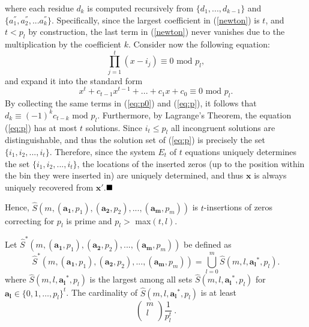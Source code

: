 \documentclass[10pt,conference]{IEEEtran}
\begin{document}
{\begin{equation}
\end{equation}
where each residue $d_k$ is computed recursively from
$\{d_1,...,d_{k-1}\}$ and $\{a_1^{''},a_2^{''},...a_k^{''}\}$.
Specifically, since the largest coefficient in (\ref{newton}) is
$t$, and $t<p_l$ by construction, the last term in (\ref{newton})
never vanishes due to the multiplication by the coefficient $k$.
Consider now the following equation:
\begin{equation}\label{eq:p0} \prod_{j=1}^t(x-i_j)\equiv 0 \text{ mod } p_l,
\end{equation}
and expand it into the standard form
\begin{equation}\label{eq:p}
x^t+c_{t-1}x^{t-1}+...+c_1x+c_0 \equiv 0 \text{ mod } p_l.
\end{equation}
By collecting the same terms in (\ref{eq:p0}) and (\ref{eq:p}), it
follows that $d_k \equiv (-1)^kc_{t-k} \text{ mod } p_l$.
Furthermore, by Lagrange's Theorem, the equation (\ref{eq:p}) has at
most $t$ solutions. Since $i_t \leq p_l$ all incongruent solutions
are distinguishable, and thus the solution set of (\ref{eq:p}) is
precisely the set $\{i_1,i_2,...,i_t\}$. Therefore, since the system
$E_t$ of $t$ equations uniquely determines the set
$\{i_1,i_2,...,i_t\}$, the locations of the inserted zeros (up to
the position within the bin they were inserted in) are uniquely
determined, and thus $\mathbf{x}$ is always uniquely recovered from
$\mathbf{x'}$.$\hfill\blacksquare$ }

Hence,
$\hat{S}\left(m,(\mathbf{a_1},p_1),(\mathbf{a_2},p_2),...,(\mathbf{a_m},p_m)\right)$
is $t$-insertions of zeros correcting for $p_l$ is prime and $p_l >$
max$(t,l)$.

 Let
$\hat{S}^*\left(m,(\mathbf{a_1},p_1),(\mathbf{a_2},p_2),...,(\mathbf{a_m},p_m)\right)$
be defined as
\begin{equation}\label{union}\hat{S}^*\left(m,(\mathbf{a_1},p_1),(\mathbf{a_2},p_2),...,(\mathbf{a_m},p_m)\right)=
\bigcup_{l=0}^{m} \hat{S}(m,l,\mathbf{a_l}^*,p_l).\end{equation}
where $\hat{S}(m,l,\mathbf{a_l}^*,p_l)$ is the largest among all
sets $\hat{S}(m,l,\mathbf{a_l}^*,p_l)$ for $\mathbf{a_l} \in
\{0,1,\dots,p_l\}^t$. The cardinality of
$\hat{S}(m,l,\mathbf{a_l}^*,p_l)$ is at least \[ \left(
\begin{array}{c}
                             m \\
                             l \\
                           \end{array}
                           \right) \frac{1}{p_l^t}~.\]
\end{document}
